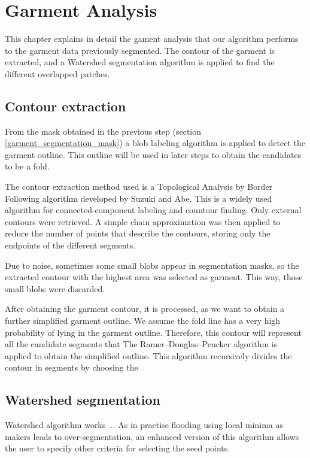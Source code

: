 \chapter{Garment Analysis}
\label{garment_analysis}

This chapter explains in detail the gament analysis that our algorithm performs to the garment data previously segmented. The contour of the garment is extracted, and a Watershed segmentation algorithm is applied to find the different overlapped patches.

\section{Contour extraction}
From the mask obtained in the previous step (section \ref{garment_segmentation_mask}) a blob labeling algorithm is applied to detect the garment outline. This outline will be used in later steps to obtain the candidates to be a fold.

The contour extraction method used is a Topological Analysis by Border Following algorithm developed by Suzuki and Abe. This is a widely used algorithm for connected-component labeling and countour finding. Only external contours were retrieved. A simple chain approximation was then applied to reduce the number of points that describe the contours, storing only the endpoints of the different segments.

Due to noise, sometimes some small blobs appear in segmentation masks, so the extracted contour with the highest area was selected as garment. This way, those small blobs were discarded.

After obtaining the garment contour, it is processed, as we want to obtain a further simplified garment outline. We assume the fold line has a very high probability of lying in the garment outline. Therefore, this contour will represent all the candidate segments that  The Ramer–Douglas–Peucker algorithm  is applied to obtain the simplified outline. This algorithm recursively divides the contour in segments by choosing the 

\section{Watershed segmentation}

Watershed algorithm works ... As in practise flooding using local minima as makers leads to over-segmentation, an enhanced version of this algorithm allows the user to specify other criteria for selecting the seed points.